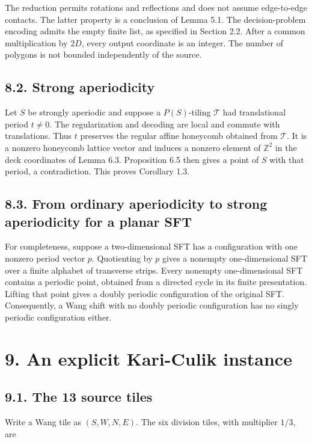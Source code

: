 \documentclass[11pt]{article}
\begin{document}
The reduction permits rotations and reflections and does not assume
edge-to-edge contacts. The latter property is a conclusion of Lemma 5.1.
The decision-problem encoding admits the empty finite list, as specified in
Section 2.2.
After a common multiplication by \(2D\), every output coordinate is an
integer. The number of polygons is not bounded independently of the source.

\subsection*{8.2. Strong aperiodicity}

Let \(S\) be strongly aperiodic and suppose a \(P(S)\)-tiling
\(\mathcal T\) had translational period \(t\neq0\). The regularization and
decoding are local and commute with translations. Thus \(t\) preserves the
regular affine honeycomb obtained from \(\mathcal T\). It is a nonzero
honeycomb lattice vector and induces a nonzero element of
\(\mathbb Z^2\) in the deck coordinates of Lemma 6.3. Proposition 6.5 then
gives a point of \(S\) with that period, a contradiction. This proves
Corollary 1.3.

\subsection*{8.3. From ordinary aperiodicity to strong aperiodicity for a planar SFT}

For completeness, suppose a two-dimensional SFT has a configuration with
one nonzero period vector \(p\). Quotienting by \(p\) gives a nonempty
one-dimensional SFT over a finite alphabet of transverse strips. Every
nonempty one-dimensional SFT contains a periodic point, obtained from a
directed cycle in its finite presentation. Lifting that point gives a
doubly periodic configuration of the original SFT. Consequently, a Wang
shift with no doubly periodic configuration has no singly periodic
configuration either.

\section*{9. An explicit Kari-Culik instance}

\subsection*{9.1. The 13 source tiles}

Write a Wang tile as \((S,W,N,E)\). The six division tiles, with multiplier
\(1/3\), are
\end{document}
